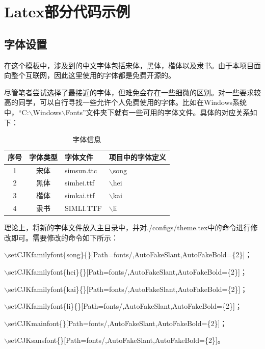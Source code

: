 \chapter{Latex部分代码示例}
\thispagestyle{main}


\section{字体设置}

在这个模板中，涉及到的中文字体包括宋体，黑体，楷体以及隶书。由于本项目面向整个互联网，因此这里使用的字体都是免费开源的。

尽管笔者尝试选择了最接近的字体，但难免会存在一些细微的区别。对一些要求较高的同学，可以自行寻找一些允许个人免费使用的字体。比如在Windows系统中，``C:$\backslash$Windows$\backslash$Fonts''文件夹下就有一些可用的字体文件。具体的对应关系如下：
\begin{table}[!ht]
\centering
\caption{字体信息}
\begin{tabular}{ccll}
    \toprule
    序号 & 字体类型 & 字体文件       & 项目中的字体定义  \\
    \midrule
    1   & 宋体    & simsun.ttc    & $\backslash$song  \\
    2   & 黑体    & simhei.ttf    & $\backslash$hei   \\
    3   & 楷体    & simkai.ttf    & $\backslash$kai   \\
    4   & 隶书    & SIMLI.TTF     & $\backslash$li    \\
    \bottomrule
\end{tabular}
\end{table}
理论上，将新的字体文件放入主目录中，并对./configs/theme.tex中的命令进行修改即可。需要修改的命令如下所示：

$\backslash$setCJKfamilyfont\{song\}\{\}[Path=fonts/,AutoFakeSlant,AutoFakeBold=\{2\}]；

$\backslash$setCJKfamilyfont\{hei\}\{\}[Path=fonts/,AutoFakeSlant,AutoFakeBold=\{2\}]；

$\backslash$setCJKfamilyfont\{kai\}\{\}[Path=fonts/,AutoFakeSlant,AutoFakeBold=\{2\}]；

$\backslash$setCJKfamilyfont\{li\}\{\}[Path=fonts/,AutoFakeSlant,AutoFakeBold=\{2\}]；

$\backslash$setCJKmainfont\{\}[Path=fonts/,AutoFakeSlant,AutoFakeBold=\{2\}]；

$\backslash$setCJKsansfont\{\}[Path=fonts/,AutoFakeSlant,AutoFakeBold=\{2\}]。

